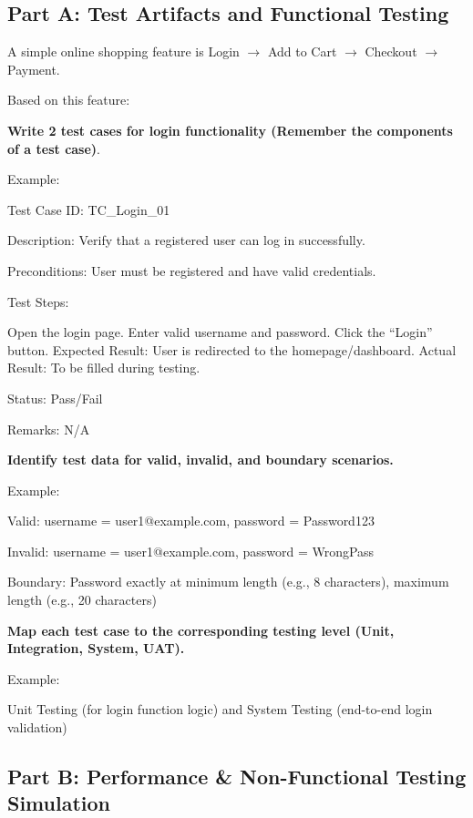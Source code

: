 \subsection{Part A: Test Artifacts and Functional Testing}

\indent 

A simple online shopping feature is Login $\rightarrow$ Add to Cart $\rightarrow$ Checkout $\rightarrow$ Payment.

Based on this feature:

\bigskip

\noindent \textbf{Write 2 test cases for login functionality (Remember the components of a test case)}.

Example:

Test Case ID: TC\_Login\_01

Description: Verify that a registered user can log in successfully.

Preconditions: User must be registered and have valid credentials.

Test Steps:

Open the login page. Enter valid username and password. Click the “Login” button. Expected Result: User is redirected to the homepage/dashboard. Actual Result: To be filled during testing.

Status: Pass/Fail

Remarks: N/A

\bigskip

\noindent\textbf{Identify test data for valid, invalid, and boundary scenarios.}

Example:

Valid: username = user1@example.com, password = Password123

Invalid: username = user1@example.com, password = WrongPass

Boundary: Password exactly at minimum length (e.g., 8 characters), maximum length (e.g., 20 characters)

\bigskip

\noindent\textbf{Map each test case to the corresponding testing level (Unit, Integration, System, UAT).}

Example:

Unit Testing (for login function logic) and System Testing (end-to-end login validation)

\subsection{Part B: Performance & Non-Functional Testing Simulation}


